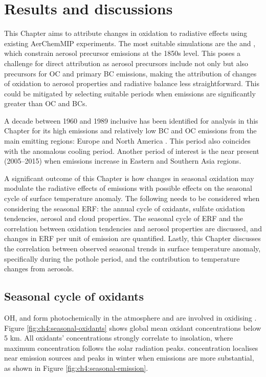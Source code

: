 \section{Results and discussions}

This Chapter aims to attribute changes in  oxidation to radiative effects using existing AerChemMIP experiments. The most suitable simulations are the \histsst{} and \sstpiaer, which constrain aerosol precursor emissions at the 1850s level. This poses a challenge for direct attribution as aerosol precursors include not only  but also precursors for OC and primary BC emissions, making the attribution of changes of  oxidation to aerosol properties and radiative balance less straightforward. This could be mitigated by selecting suitable periods when  emissions are significantly greater than OC and BCs. 

A decade between 1960 and 1989 inclusive has been identified for analysis in this Chapter for its high  emissions and relatively low BC and OC emissions from the main emitting regions: Europe and North America \citep{hoeslyHistorical175020142018}. This period also coincides with the anomalous cooling period. Another period of interest is the near present (2005--2015) when  emissions increase in Eastern and Southern Asia regions. 

A significant outcome of this Chapter is how changes in seasonal oxidation may modulate the radiative effects of  emissions with possible effects on the seasonal cycle of surface temperature anomaly. The following needs to be considered when considering the seasonal ERF: the annual cycle of oxidants, sulfate oxidation tendencies, aerosol and cloud properties. The seasonal cycle of ERF and the correlation between oxidation tendencies and aerosol properties are discussed, and changes in ERF per unit of  emission are quantified. Lastly, this Chapter discusses the correlation between observed seasonal trends in surface temperature anomaly, specifically during the pothole period, and the contribution to temperature changes from aerosols.

\subsection{Seasonal cycle of oxidants}

OH,  and  form photochemically in the atmosphere and are involved in oxidising . Figure \ref{fig:ch4:seasonal-oxidants} shows global mean oxidant concentrations below 5 km. All oxidants' concentrations strongly correlate to insolation, where maximum concentration follows the solar radiation peaks.  concentration localises near emission sources and peaks in winter when emissions are more substantial, as shown in Figure \ref{fig:ch4:seasonal-emission}.

